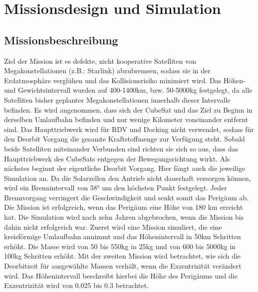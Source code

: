 \chapter{Missionsdesign und Simulation}


\section{Missionsbeschreibung}

Ziel der Mission ist es defekte, nicht kooperative Satelliten von Megakonstellationen (z.B.: Starlink) abzubremsen, sodass sie in der Erdatmosphäre verglühen und das Kollisionsrisiko minimiert wird. Das Höhen- und Gewichtsintervall wurden auf 400-1400km, bzw. 50-5000kg festgelegt, da alle Satelliten bisher geplanter Megakonstellationen innerhalb dieser Intervalle befinden.
Es wird angenommen, dass sich der CubeSat und das Ziel zu Beginn in derselben Umlaufbahn befinden und nur wenige Kilometer voneinander entfernt sind. Das Haupttriebwerk wird für RDV und Docking nicht verwendet, sodass für den Deorbit Vorgang die gesamte Kraftstoffmenge zur Verfügung steht. Sobald beide Satelliten miteinander Verbunden sind richten sie sich so aus, dass das Haupttriebwerk des CubeSats entgegen der Bewegungsrichtung wirkt. Als nächstes beginnt der eigentliche Deorbit Vorgang. Hier fängt auch die jeweilige Simulation an. Da die Solarzellen den Antrieb nicht dauerhaft versorgen können, wird ein Brennintervall von 58° um den höchsten Punkt festgelegt. Jeder Brennvorgang verringert die Geschwindigkeit und senkt somit das Perigäum ab. Die Mission ist erfolgreich, wenn das Perigäum eine Höhe von 180 km erreicht hat. Die Simulation wird nach zehn Jahren abgebrochen, wenn die Mission bis dahin nicht erfolgreich war. 
Zuerst wird eine Mission simuliert, die eine kreisförmige Umlaufbahn annimmt und das Höhenintervall in 50km Schritten erhöht. Die Masse wird von 50 bis 550kg in 25kg und von 600 bis 5000kg in 100kg Schritten erhöht.
Mit der zweiten Mission wird betrachtet, wie sich die Deorbitzeit für ausgewählte Massen verhält, wenn die Exzentrizität verändert wird. Das Höhenintervall beschreibt hierbei die Höhe des Perigäums und die Exzentrizität wird von 0.025 bis 0.3 betrachtet.
	
